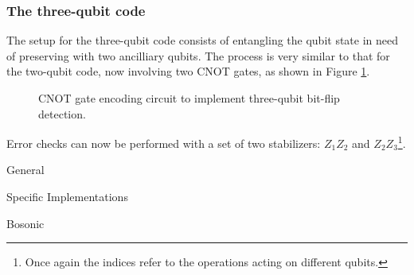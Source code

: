 \subsubsection{The three-qubit code}

The setup for the three-qubit code consists of entangling the qubit state in need of preserving with two ancilliary qubits. The process is very similar to that for the two-qubit code, now involving two CNOT gates, as shown in Figure \ref{fig:three_qub_enc}.
\begin{figure}
    \centering
    \caption{CNOT gate encoding circuit to implement three-qubit bit-flip detection.}
    \label{fig:three_qub_enc}
\end{figure}

Error checks can now be performed with a set of two stabilizers: $Z_1Z_2$ and $Z_2Z_3$\footnote{Once again the indices refer to the operations acting on different qubits.}.



\clearpage

General \cite{Girvin2021} \cite{Andersen2020} \cite{Gottesman2009} \cite{Roffe2019} \cite{devitt}

Specific Implementations \cite{Krinner2021} \cite{Chen2021} \cite{cleland2022}

Bosonic \cite{campagne2020} \cite{Lau2016} \cite{Chuang1997} \cite{Terhal2020} \cite{Blais2020} \cite{Hu2019} \cite{Michael2016} \cite{Grimsmo2021} \cite{Cai2021} \cite{Brady2023} \cite{lachance2023}